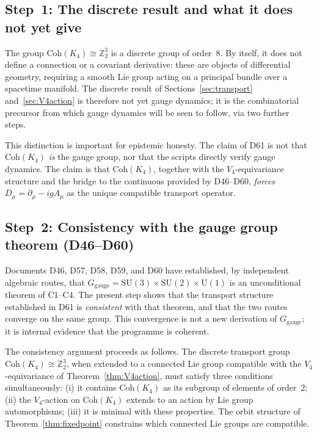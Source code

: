 \documentclass[11pt,a4paper]{article}
\theoremstyle{plain}
\theoremstyle{definition}
\theoremstyle{remark}
\newcommand{\Vfour}{V_4}
\newcommand{\Uone}{\mathrm{U}(1)}
\newcommand{\SUtwo}{\mathrm{SU}(2)}
\newcommand{\SUthree}{\mathrm{SU}(3)}
\newcommand{\Ggauge}{G_{\mathrm{gauge}}}
\newcommand{\Coh}{\mathrm{Coh}(K_4)}
\newcommand{\Dmu}{D_\mu}
\begin{document}
\subsection{Step~1: The discrete result and what it does not yet give}

The group $\Coh \cong \mathbb{Z}_2^3$ is a discrete group of order~8. By itself,
it does not define a connection or a covariant derivative: these are objects of
differential geometry, requiring a smooth Lie group acting on a principal bundle
over a spacetime manifold. The discrete result of Sections~\ref{sec:transport}
and~\ref{sec:V4action} is therefore not yet gauge dynamics; it is the combinatorial
precursor from which gauge dynamics will be seen to follow, via two further steps.

This distinction is important for epistemic honesty. The claim of D61 is not that
$\Coh$ \emph{is} the gauge group, nor that the scripts directly verify gauge dynamics.
The claim is that $\Coh$, together with the $\Vfour$-equivariance structure and the
bridge to the continuous provided by D46--D60, \emph{forces} $\Dmu = \partial_\mu - igA_\mu$
as the unique compatible transport operator.

\subsection{Step~2: Consistency with the gauge group theorem (D46--D60)}

Documents D46, D57, D58, D59, and D60 have established, by independent algebraic
routes, that $\Ggauge = \SUthree \times \SUtwo \times \Uone$ is an unconditional
theorem of C1--C4. The present step shows that the transport structure established
in D61 is \emph{consistent} with that theorem, and that the two routes converge on
the same group. This convergence is not a new derivation of $\Ggauge$; it is
internal evidence that the programme is coherent.

The consistency argument proceeds as follows. The discrete transport group
$\Coh \cong \mathbb{Z}_2^3$, when extended to a connected Lie group compatible with
the $\Vfour$-equivariance of Theorem~\ref{thm:V4action}, must satisfy three
conditions simultaneously: (i) it contains $\Coh$ as its subgroup of elements of
order~2; (ii) the $\Vfour$-action on $\Coh$ extends to an action by Lie group
automorphisms; (iii) it is minimal with these properties. The orbit structure of
Theorem~\ref{thm:fixedpoint} constrains which connected Lie groups are compatible.
\end{document}
